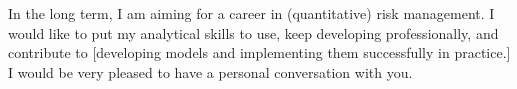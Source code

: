 In the long term, I am aiming for a career in {(quantitative) risk management}. I would like to put my analytical skills to use, keep developing professionally, and contribute to [developing models and implementing them successfully in practice.] I would be very pleased to have a personal conversation with you.
